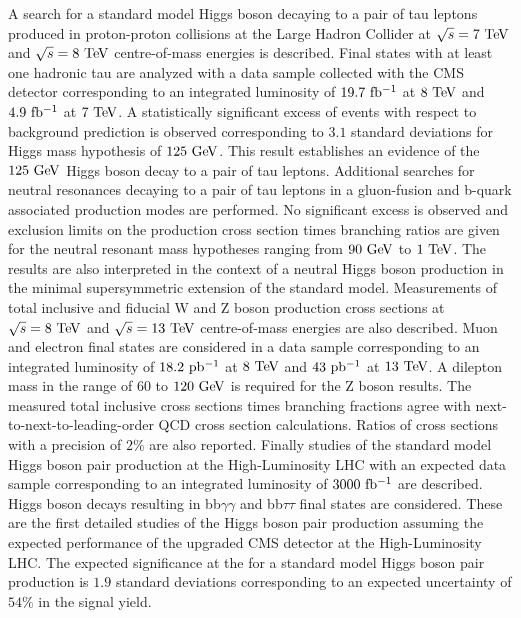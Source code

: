 % 
% 
%


A search for a standard model Higgs boson decaying to a pair of tau leptons produced in proton-proton collisions at the Large Hadron Collider at $\sqrt{s}=7~\mathrm{Te\kern -0.1em V}$ and $\sqrt{s}=8~\mathrm{Te\kern -0.1em V}$ centre-of-mass energies is described. Final states with at least one hadronic tau are analyzed with a data sample collected with the CMS detector corresponding to an integrated luminosity of $19.7~\mathrm{fb^{-1}}$ at $8~\mathrm{Te\kern -0.1em V}$ and $4.9~\mathrm{fb^{-1}}$ at $7~\mathrm{Te\kern -0.1em V}$. A statistically significant excess of events with respect to background prediction is observed corresponding to $3.1$ standard deviations for Higgs mass hypothesis of $125~\mathrm{Ge\kern -0.1em V}$. This result establishes an evidence of the $125~\mathrm{Ge\kern -0.1em V}$ Higgs boson decay to a pair of tau leptons. Additional searches for neutral resonances decaying to a pair of tau leptons in a gluon-fusion and b-quark associated production modes are performed. No significant excess is observed and exclusion limits on the production cross section times branching ratios are given for the neutral resonant mass hypotheses ranging from $90~\mathrm{Ge\kern -0.1em V}$ to $1~\mathrm{Te\kern -0.1em V}$. The results are also interpreted in the context of a neutral Higgs boson production in the minimal supersymmetric extension of the standard model. Measurements of total inclusive and fiducial W and Z boson production cross sections at $\sqrt{s}=8~\mathrm{Te\kern -0.1em V}$  and $\sqrt{s}=13~\mathrm{Te\kern -0.1em V}$ centre-of-mass energies are also described. Muon and electron final states are considered in a data sample corresponding to an integrated luminosity of $18.2~\mathrm{pb^{-1}}$ at $8~\mathrm{Te\kern -0.1em V}$ and $43~\mathrm{pb^{-1}}$ at $13~\mathrm{Te\kern -0.1em V}$. A dilepton mass in the range of $60$ to $120~\mathrm{Ge\kern -0.1em V}$ is required for the Z boson results. The measured total inclusive cross sections times branching fractions agree with next-to-next-to-leading-order QCD cross section calculations. Ratios of cross sections with a precision of $2\%$ are also reported. Finally studies of the standard model Higgs boson pair production at the High-Luminosity LHC with an expected data sample corresponding to an integrated luminosity of $3000~\mathrm{fb^{-1}}$ are described. Higgs boson decays resulting in bb$\gamma\gamma$ and bb$\tau\tau$ final states are considered. These are the first detailed studies of the Higgs boson pair production assuming the expected performance of the upgraded CMS detector at the High-Luminosity LHC. The expected significance at the for a standard model Higgs boson pair production is $1.9$ standard deviations corresponding to an expected uncertainty of $54\%$ in the signal yield. 


